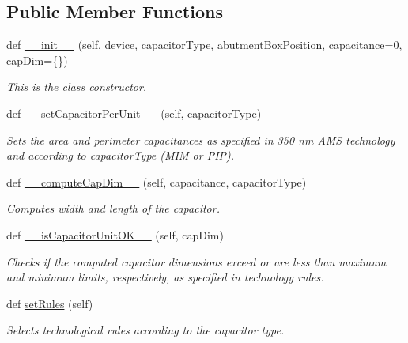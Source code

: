 \subsection*{Public Member Functions}
\begin{DoxyCompactItemize}
\item 
def \mbox{\hyperlink{classpython_1_1capacitorunit_1_1CapacitorUnit_ae3f080385324a5f7e92d5fa9d99dc8d4}{\+\_\+\+\_\+init\+\_\+\+\_\+}} (self, device, capacitor\+Type, abutment\+Box\+Position, capacitance=0, cap\+Dim=\{\})
\begin{DoxyCompactList}\small\item\em This is the class constructor. \end{DoxyCompactList}\item 
def \mbox{\hyperlink{classpython_1_1capacitorunit_1_1CapacitorUnit_a7c8aa8fda868a8ac87effa912fd95b74}{\+\_\+\+\_\+set\+Capacitor\+Per\+Unit\+\_\+\+\_\+}} (self, capacitor\+Type)
\begin{DoxyCompactList}\small\item\em Sets the area and perimeter capacitances as specified in 350 nm A\+MS technology and according to {\ttfamily capacitor\+Type} (M\+IM or P\+IP). \end{DoxyCompactList}\item 
def \mbox{\hyperlink{classpython_1_1capacitorunit_1_1CapacitorUnit_a3fa95cb90eed911f790274f5c90aaa67}{\+\_\+\+\_\+compute\+Cap\+Dim\+\_\+\+\_\+}} (self, capacitance, capacitor\+Type)
\begin{DoxyCompactList}\small\item\em Computes width and length of the capacitor. \end{DoxyCompactList}\item 
def \mbox{\hyperlink{classpython_1_1capacitorunit_1_1CapacitorUnit_a2fcd6e2dddbbe5fcb09c9365cde11535}{\+\_\+\+\_\+is\+Capacitor\+Unit\+O\+K\+\_\+\+\_\+}} (self, cap\+Dim)
\begin{DoxyCompactList}\small\item\em Checks if the computed capacitor dimensions exceed or are less than maximum and minimum limits, respectively, as specified in technology rules. \end{DoxyCompactList}\item 
def \mbox{\hyperlink{classpython_1_1capacitorunit_1_1CapacitorUnit_a458149b1404a0e797668330beb75b640}{set\+Rules}} (self)
\begin{DoxyCompactList}\small\item\em Selects technological rules according to the capacitor type. \end{DoxyCompactList}\item 

\end{DoxyCompactItemize}
